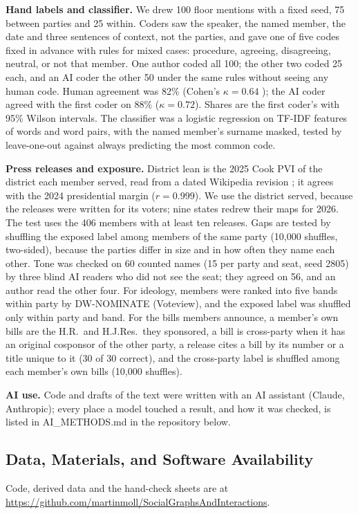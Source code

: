 \documentclass[9pt,twocolumn,twoside]{pnas-new}
\begin{document}
{\textbf{Hand labels and classifier.} We drew 100 floor mentions with a fixed seed, 75 between parties and 25 within.
Coders saw the speaker, the named member, the date and three sentences of context, not the parties, and gave one
of five codes fixed in advance with rules for mixed cases: procedure, agreeing, disagreeing, neutral, or not that
member. One author coded all 100; the other two coded 25 each, and an AI coder the other 50 under the same rules
without seeing any human code. Human agreement was 82\% (Cohen's $\kappa = 0.64$ \cite{cohen1960}); the AI coder
agreed with the first coder on 88\% ($\kappa = 0.72$). Shares are the first coder's with 95\% Wilson intervals. The
classifier was a logistic regression on TF-IDF features of words and word pairs, with the named member's surname
masked, tested by leave-one-out against always predicting the most common code.

\textbf{Press releases and exposure.} District lean is the 2025 Cook PVI \cite{cook2025pvi} of the district each
member served, read from a dated Wikipedia revision \cite{wikipedia2025pvi}; it agrees with the 2024 presidential
margin \cite{downballot2024} ($r = 0.999$). We use the district served, because the releases were written for its
voters; nine states redrew their maps for 2026. The test uses the 406 members with at least ten releases. Gaps are
tested by shuffling the exposed label among members of the same party (10,000 shuffles, two-sided), because the
parties differ in size and in how often they name each other. Tone was checked on 60 counted names (15 per party and
seat, seed 2805) by three blind AI readers who did not see the seat; they agreed on 56, and an author read the other
four. For ideology, members were ranked into five bands within party by DW-NOMINATE (Voteview), and the exposed label
was shuffled only within party and band. For the bills members announce, a member's own bills are the H.R.\ and
H.J.Res.\ they sponsored, a bill is cross-party when it has an original cosponsor of the other party, a release
cites a bill by its number or a title unique to it (30 of 30 correct), and the cross-party label is shuffled among
each member's own bills (10,000 shuffles).

\textbf{AI use.} Code and drafts of the text were written with an AI assistant (Claude, Anthropic); every place a
model touched a result, and how it was checked, is listed in AI\_METHODS.md in the repository below.

\subsection*{Data, Materials, and Software Availability}
Code, derived data and the hand-check sheets are at \url{https://github.com/martinmoll/SocialGraphsAndInteractions}.
}

\showmatmethods{}


\end{document}
